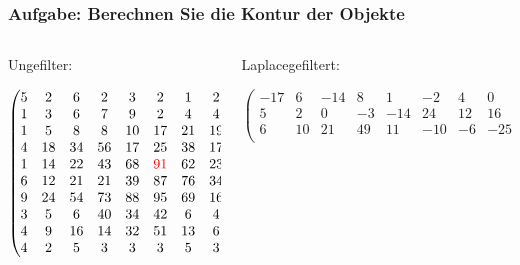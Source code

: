 \documentclass[aspectratio=169]{beamer}
\begin{document}
\begin{frame}
    \frametitle{Aufgabe: Berechnen Sie die Kontur der Objekte}
\begin{columns}
    \begin{column}{0.4\textwidth}
    \begin{alertblock}
        {Ungefilter:}
        \begin{tiny}
        \begin{equation*}
            \begin{pmatrix}
                5 &  2 &  6 &  2 &  3 &  2 &  1 &  2 &  3 &  1 \\
                1 &  3 &  6 &  7 &  9 &  2 &  4 &  4 &  7 &  1 \\
                1 &  5 &  8 &  8 & 10 & 17 & 21 & 19 &  9 &  4 \\
                4 & 18 & 34 & 56 & 17 & 25 & 38 & 17 &  7 &  2 \\
                1 & 14 & 22 & 43 & 68 & \textcolor{red}{91} & 62 & 23 & 16 &  7 \\
                6 & 12 & 21 & 21 & 39 & 87 & 76 & 34 &  4 &  2 \\
                9 & 24 & 54 & 73 & 88 & 95 & 69 & 16 & 12 &  5 \\
                3 &  5 &  6 & 40 & 34 & 42 &  6 &  4 &  2 &  5 \\
                4 &  9 & 16 & 14 & 32 & 51 & 13 &  6 &  6 &  2 \\
                4 &  2 &  5 & 3  &  3 &  3 &  5 &  3 &  3 &  3 \\
            \end{pmatrix}
        \end{equation*}
        \end{tiny}
    \end{alertblock}
    \end{column}
    \begin{column}{0.6\textwidth}
    \begin{alertblock}
        {Laplacegefiltert:}
        \begin{tiny}
        \begin{equation*}
            \begin{pmatrix}
                 -17 &   6 & -14 &    8 &    1 &   -2 &   4 &   0 &  -2 &   0 \\
                   5 &   2 &   0 &   -3 &  -14 &   24 &  12 &  16 & -11 &   8 \\
                   6 &  10 &  21 &   49 &   11 &  -10 &  -6 & -25 &   1 &  -4 \\

\end{pmatrix}
\end{equation*}
\end{tiny}
\end{alertblock}
\end{column}
\end{columns}
\end{frame}
\end{document}

